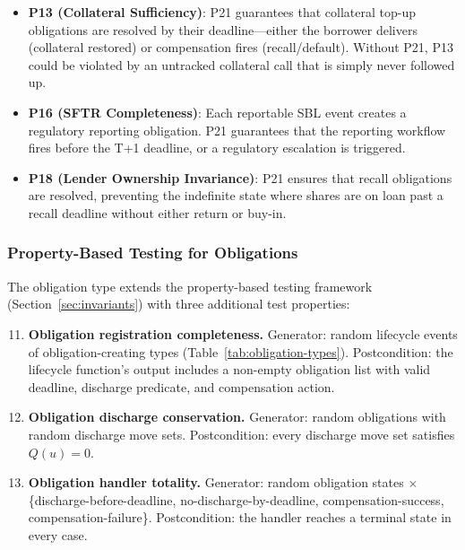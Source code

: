 \documentclass[11pt,a4paper]{article}
\begin{document}
\begin{itemize}[nosep]
\item \textbf{P13 (Collateral Sufficiency)}: P21 guarantees that collateral top-up obligations are resolved by their deadline---either the borrower delivers (collateral restored) or compensation fires (recall/default). Without P21, P13 could be violated by an untracked collateral call that is simply never followed up.

\item \textbf{P16 (SFTR Completeness)}: Each reportable SBL event creates a regulatory reporting obligation. P21 guarantees that the reporting workflow fires before the T+1 deadline, or a regulatory escalation is triggered.

\item \textbf{P18 (Lender Ownership Invariance)}: P21 ensures that recall obligations are resolved, preventing the indefinite state where shares are on loan past a recall deadline without either return or buy-in.
\end{itemize}

\subsubsection{Property-Based Testing for Obligations}
\label{sec:obligation-testing}

The obligation type extends the property-based testing framework (Section~\ref{sec:invariants}) with three additional test properties:

\begin{enumerate}\setcounter{enumi}{10}
\item \textbf{Obligation registration completeness.} Generator: random lifecycle events of obligation-creating types (Table~\ref{tab:obligation-types}). Postcondition: the lifecycle function's output includes a non-empty obligation list with valid deadline, discharge predicate, and compensation action.

\item \textbf{Obligation discharge conservation.} Generator: random obligations with random discharge move sets. Postcondition: every discharge move set satisfies $Q(u) = 0$.

\item \textbf{Obligation handler totality.} Generator: random obligation states $\times$ \{discharge-before-deadline, no-discharge-by-deadline, compensation-success, compensation-failure\}. Postcondition: the handler reaches a terminal state in every case.
\end{enumerate}
\end{document}
